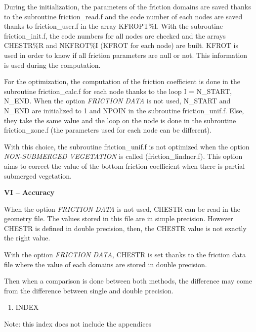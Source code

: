 \documentclass{article} %
\begin{document}
 \textbf{}

 During the initialization, the parameters of the friction domains are saved thanks to the subroutine friction\_read.f and the code number of each nodes are saved thanks to friction\_user.f in the array KFROPT\%I. With the subroutine friction\_init.f, the code numbers for all nodes are checked and the arrays CHESTR\%R and NKFROT\%I (KFROT for each node) are built. KFROT is used in order to know if all friction parameters are null or not. This information is used during the computation.

 \textbf{}

 For the optimization, the computation of the friction coefficient is done in the subroutine friction\_calc.f for each node thanks to the loop I = N\_START, N\_END. When the option \textit{FRICTION DATA} is not used, N\_START and N\_END are initialized to 1 and NPOIN in the subroutine friction\_unif.f. Else, they take the same value and the loop on the node is done in the subroutine friction\_zone.f  (the  parameters used for each node can be different).

 With this choice, the subroutine friction\_unif.f is not optimized when the option \textit{NON-SUBMERGED VEGETATION} is called (friction\_lindner.f). This option aims to correct the value of the bottom friction coefficient when there is partial submerged vegetation.

 \textbf{VI -- Accuracy}

 When the option \textit{FRICTION DATA} is not used, CHESTR can be read in the geometry file. The values stored in this file are in simple precision. However CHESTR is defined in double precision, then, the CHESTR value is not exactly the right value.

 With the option \textit{FRICTION DATA}, CHESTR is set thanks to the friction data file where the value of each domains are stored in double precision.

 Then when a comparison is done between both methods, the difference may come from the difference between single and double precision.



\begin{enumerate}
\item    INDEX
\end{enumerate}

 Note: this index does not include the appendices
\end{document}
